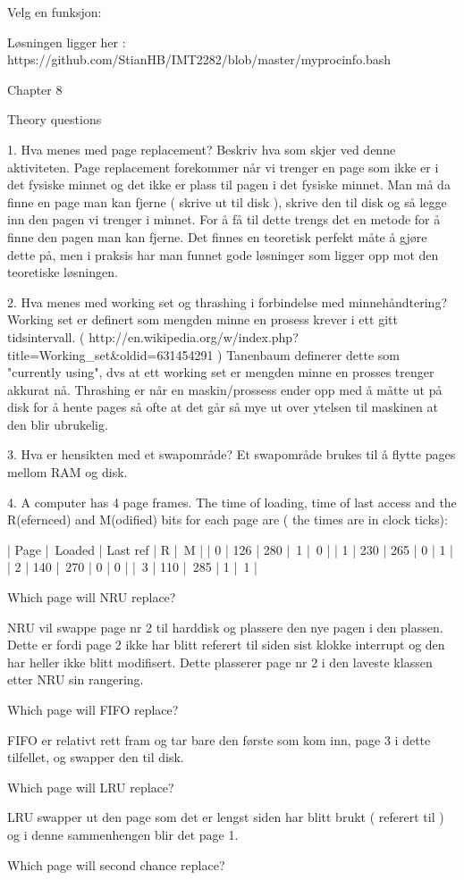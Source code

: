 Velg en funksjon:

Løsningen ligger her : https://github.com/StianHB/IMT2282/blob/master/myprocinfo.bash


Chapter 8

Theory questions

1. Hva menes med page replacement? Beskriv hva som skjer ved denne aktiviteten.
Page replacement forekommer når vi trenger en page som ikke er i det fysiske minnet og det ikke er plass til pagen i det fysiske minnet. Man må da finne en page man kan fjerne ( skrive ut til disk ), skrive den til disk og så legge inn den pagen vi trenger i minnet. For å få til dette trengs det en metode for å finne den pagen man kan fjerne. Det finnes en teoretisk perfekt måte å gjøre dette på, men i praksis har man funnet gode løsninger som ligger opp mot den teoretiske løsningen.

2. Hva menes med working set og thrashing i forbindelse med minnehåndtering?
Working set er definert som mengden minne en prosess krever i ett gitt tidsintervall. ( http://en.wikipedia.org/w/index.php?title=Working_set&oldid=631454291 ) Tanenbaum definerer dette som "currently using", dvs at ett working set er mengden minne en prosses trenger akkurat nå. Thrashing er når en maskin/prossess ender opp med å måtte ut på disk for å hente pages så ofte at det går så mye ut over ytelsen til maskinen at den blir ubrukelig.

3. Hva er hensikten med et swapområde?
Et swapområde brukes til å flytte pages mellom RAM og disk.

4. A computer has 4 page frames. The time of loading, time of last access and the R(efernced) and M(odified) bits for each page are ( the times are in clock ticks):

| Page | Loaded | Last ref | R | M |
| 0    | 126    | 280      | 1 | 0 |
| 1    | 230    | 265      | 0 | 1 |
| 2    | 140    | 270      | 0 | 0 |
| 3    | 110    | 285      | 1 | 1 |

Which page will NRU replace?

NRU vil swappe page nr 2 til harddisk og plassere den nye pagen i den plassen. Dette er fordi page 2 ikke har blitt referert til siden sist klokke interrupt og den har heller ikke blitt modifisert. Dette plasserer page nr 2 i den laveste klassen etter NRU sin rangering.

Which page will FIFO replace?

FIFO er relativt rett fram og tar bare den første som kom inn, page 3 i dette tilfellet, og swapper den til disk.

Which page will LRU replace?

LRU swapper ut den page som det er lengst siden har blitt brukt ( referert til ) og i denne sammenhengen blir det page 1. 

Which page will second chance replace?
